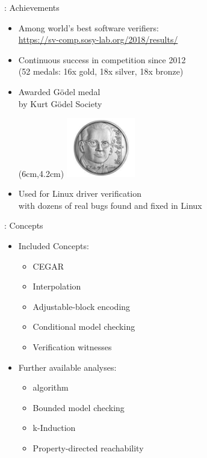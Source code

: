 
\begin{frame}{\cpacheckertitle: Achievements}
\begin{itemize}
  \item Among world's best software verifiers:\\
  \smaller\url{https://sv-comp.sosy-lab.org/2018/results/}\larger
  \item Continuous success in competition since 2012\\
    (52 medals: 16x gold, 18x silver, 18x bronze)
  \item Awarded Gödel medal\\ by Kurt Gödel Society
    \begin{textblock*}{3cm}(6cm,4.2cm)%
      \includegraphics[width=3cm]{content/chapter_model_checking/cpachecker/images/goedel-medal}%
    \end{textblock*}%
    \bigskip
    \bigskip
    \bigskip
    \bigskip
  \item Used for Linux driver verification\\ with dozens of real bugs found and fixed in Linux
\end{itemize}
\end{frame}


\begin{frame}{\cpacheckertitle: Concepts}
  \begin{itemize}
    \item Included Concepts:
    \begin{itemize}
      \item CEGAR
      \item Interpolation
      \item Adjustable-block encoding
      \item Conditional model checking
      \item Verification witnesses
    \end{itemize}
    \item Further available analyses:
    \begin{itemize}
      \item \impact algorithm
      \item Bounded model checking
      \item k-Induction
      \item Property-directed reachability
    \end{itemize}
  \end{itemize}
\end{frame}


